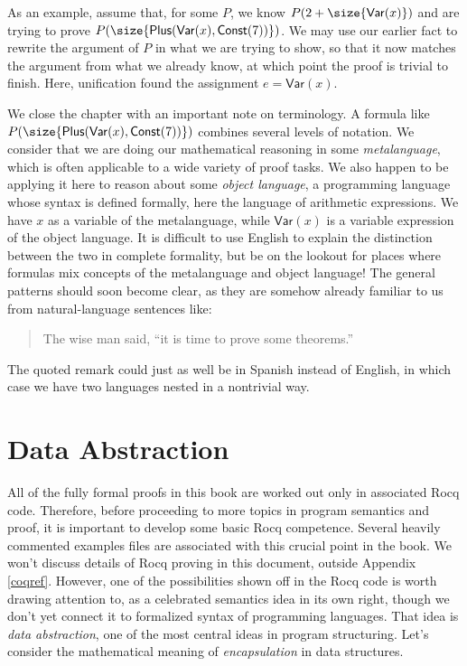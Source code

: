 \documentclass{amsbook}
\theoremstyle{definition}
\theoremstyle{remark}
\numberwithin{section}{chapter}
\numberwithin{equation}{chapter}
\begin{document}
As an example, assume that, for some $P$, we know $P(2 + \size{\mathsf{Var}(x)})$ and are trying to prove $P(\size{\mathsf{Plus}(\mathsf{Var}(x), \mathsf{Const}(7))})$.
We may use our earlier fact to rewrite the argument of $P$ in what we are trying to show, so that it now matches the argument from what we already know, at which point the proof is trivial to finish.
Here, unification found the assignment $e = \mathsf{Var}(x)$.

\medskip

\encoding
\label{metalanguage}
We close the chapter with an important note on terminology.
A formula like $P(\size{\mathsf{Plus}(\mathsf{Var}(x), \mathsf{Const}(7))})$ combines several levels of notation.
We consider that we are doing our mathematical reasoning in some \emph{metalanguage}, which is often applicable to a wide variety of proof tasks.
We also happen to be applying it here to reason about some \emph{object language}, a programming language whose syntax is defined formally, here the language of arithmetic expressions.
We have $x$ as a variable of the metalanguage, while $\mathsf{Var}(x)$ is a variable expression of the object language.
It is difficult to use English to explain the distinction between the two in complete formality, but be on the lookout for places where formulas mix concepts of the metalanguage and object language!
The general patterns should soon become clear, as they are somehow already familiar to us from natural-language sentences like:
\begin{quote}
  The wise man said, ``it is time to prove some theorems.''
\end{quote}
The quoted remark could just as well be in Spanish instead of English, in which case we have two languages nested in a nontrivial way.



\chapter{Data Abstraction}\label{adt}

All of the fully formal proofs in this book are worked out only in associated Rocq code.
Therefore, before proceeding to more topics in program semantics and proof, it is important to develop some basic Rocq competence.
Several heavily commented examples files are associated with this crucial point in the book.
We won't discuss details of Rocq proving in this document, outside Appendix \ref{coqref}.
However, one of the possibilities shown off in the Rocq code is worth drawing attention to, as a celebrated semantics idea in its own right, though we don't yet connect it to formalized syntax of programming languages.
That idea is \emph{data abstraction}, one of the most central ideas in program structuring.
Let's consider the mathematical meaning of \emph{encapsulation} in data structures.
\end{document}
